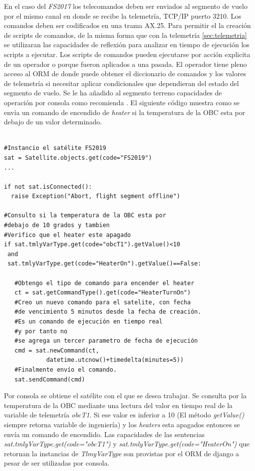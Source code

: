 \documentclass[twoside,twocolumn]{article}
\begin{document}
En el caso del \textit{FS2017} los telecomandos deben ser enviados al segmento de vuelo por el mismo canal en donde se recibe la telemetría, TCP/IP puerto 3210. Los comandos deben ser codificados en una trama AX.25. 
Para permitir el la creación de scripts de comandos, de la misma forma que con la telemetría \ref{sec:telemetria} se utilizaran las capacidades de reflexión para analizar en tiempo de ejecución los scripts a ejecutar. Los scripts de comandos pueden ejecutarse por acción explicita de un operador o porque fueron aplicados a una pasada. 
El operador tiene pleno acceso al ORM de donde puede obtener el diccionario de comandos y los valores de telemetría si necesitar aplicar condicionales que dependieran del estado del segmento de vuelo. Se le ha añadido al segmento terreno capacidades de operación por consola como recomienda \cite{galal2001satellite}. El siguiente código muestra como se envía un comando de encendido de \textit{heater} si la temperatura de la OBC esta por debajo de un valor determinado.

\begin{verbatim}

#Instancio el satélite FS2019
sat = Satellite.objects.get(code="FS2019")
...

if not sat.isConnected():
  raise Exception("Abort, flight segment offline")

#Consulto si la temperatura de la OBC esta por 
#debajo de 10 grados y tambien
#Verifico que el heater este apagado
if sat.tmlyVarType.get(code="obcT1").getValue()<10 
 and 
 sat.tmlyVarType.get(code="HeaterOn").getValue()==False:
   
   #Obtengo el tipo de comando para encender el heater
   ct = sat.getCommandType().get(code="HeaterTurnOn")
   #Creo un nuevo comando para el satelite, con fecha 
   #de vencimiento 5 minutos desde la fecha de creación. 
   #Es un comando de ejecución en tiempo real 
   #y por tanto no 
   #se agrega un tercer parametro de fecha de ejecución
   cmd = sat.newCommand(ct, 
	        datetime.utcnow()+timedelta(minutes=5))
   #Finalmente envío el comando.
   sat.sendCommand(cmd)
\end{verbatim}

Por consola se obtiene el satélite con el que se desea trabajar. Se consulta por la temperatura de la OBC mediante una lectura del valor en tiempo real de la variable de telemetría \textit{obcT1}. Si ese valor es inferior a 10 (El método  \textit{getValue()} siempre retorna variable de ingeniería) y los \textit{heaters} esta apagados entonces se envía un comando de encendido.
Las capacidades de las sentencias \textit{sat.tmlyVarType.get(code="obcT1")} y \textit{sat.tmlyVarType.get(code="HeaterOn")} que retornan la instancias de \textit{TlmyVarType} son provistas por el ORM de django a pesar de ser utilizadas por consola. 
\end{document}
